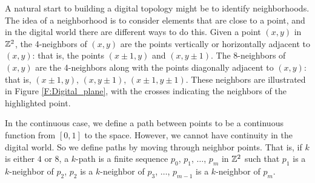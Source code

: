 A natural start to building a digital topology might be to identify neighborhoods. The idea of a neighborhood is to consider elements that are close to a point, and in the digital world there are different ways to do this. Given a point $(x,y)$ in $\mathbb{Z}^2$, the 4-neighbors of $(x,y)$ are the points vertically or horizontally adjacent to $(x,y)$: that is, the points $(x \pm 1, y)$ and $(x, y \pm 1)$. The 8-neighbors of $(x,y)$ are the 4-neighbors along with the points diagonally adjacent to $(x,y)$: that is, $(x \pm 1, y)$, $(x, y \pm 1)$, $(x \pm 1, y \pm 1)$. These neighbors are illustrated in Figure \ref{F:Digital_plane}, with the crosses indicating the neighbors of the highlighted point. 

In the continuous case, we define a path between points to be a continuous function from $[0,1]$ to the space. However, we cannot have continuity in the digital world. So we define paths by moving through neighbor points. That is, if $k$ is either $4$ or $8$, a $k$-path is a finite sequence $p_0$, $p_1$, $\ldots$, $p_m$ in $\mathbb{Z}^2$ such that $p_1$ is a $k$-neighbor of $p_2$, $p_2$ is a $k$-neighbor of $p_3$, $\ldots$, $p_{m-1}$ is a $k$-neighbor of $p_m$.  

